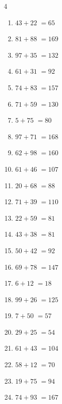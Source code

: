 \begin{multicols}{4}
\begin{enumerate}
  \item $43+22$
        $=65$

  \item $81+88$
        $=169$

  \item $97+35$
        $=132$

  \item $61+31$
        $=92$

  \item $74+83$
        $=157$

  \item $71+59$
        $=130$

  \item $5+75$
        $=80$

  \item $97+71$
        $=168$

  \item $62+98$
        $=160$

  \item $61+46$
        $=107$

  \item $20+68$
        $=88$

  \item $71+39$
        $=110$

  \item $22+59$
        $=81$

  \item $43+38$
        $=81$

  \item $50+42$
        $=92$

  \item $69+78$
        $=147$

  \item $6+12$
        $=18$

  \item $99+26$
        $=125$

  \item $7+50$
        $=57$

  \item $29+25$
        $=54$

  \item $61+43$
        $=104$

  \item $58+12$
        $=70$

  \item $19+75$
        $=94$

  \item $74+93$
        $=167$


\end{enumerate}
\end{multicols}
